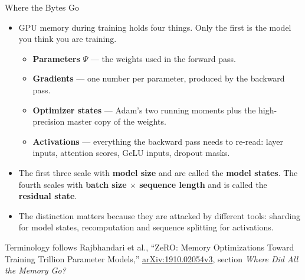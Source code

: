 \begin{frame}{Where the Bytes Go}
  \begin{itemize}\itemsep0.35em
    \item[\textcolor{red}{$\blacktriangleright$}] GPU memory during training holds four things. Only the first is the model you think you are training.
      \begin{itemize}\itemsep0.15em\footnotesize
        \item \textbf{Parameters} $\Psi$ --- the weights used in the forward pass.
        \item \textbf{Gradients} --- one number per parameter, produced by the backward pass.
        \item \textbf{Optimizer states} --- Adam's two running moments plus the high-precision master copy of the weights.
        \item \textbf{Activations} --- everything the backward pass needs to re-read: layer inputs, attention scores, GeLU inputs, dropout masks.
      \end{itemize}
    \item[\textcolor{red}{$\blacktriangleright$}] The first three scale with \textbf{model size} and are called the \textbf{model states}. The fourth scales with \textbf{batch size $\times$ sequence length} and is called the \textbf{residual state}.
    \item[\textcolor{red}{$\blacktriangleright$}] The distinction matters because they are attacked by different tools: sharding for model states, recomputation and sequence splitting for activations.
  \end{itemize}
  \vspace{0.2em}
  {\scriptsize Terminology follows Rajbhandari et al., ``ZeRO: Memory Optimizations Toward Training Trillion Parameter Models,'' \href{https://arxiv.org/abs/1910.02054v3}{arXiv:1910.02054v3}, section \emph{Where Did All the Memory Go?}}
\end{frame}

